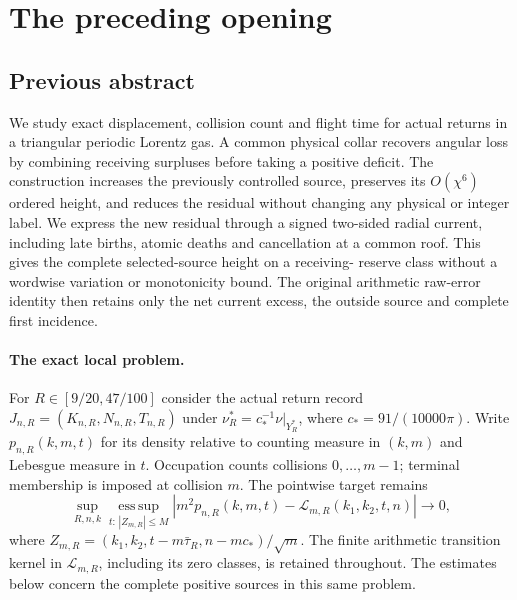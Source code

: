 \section{The preceding opening}
\label{app:v72-retained-front}
\subsection*{Previous abstract}

We study exact displacement, collision count and flight time for
actual returns in a triangular periodic Lorentz gas. A common physical
collar recovers angular loss by combining receiving surpluses before
taking a positive deficit. The construction increases the previously
controlled source, preserves its $O(\chi^6)$ ordered height, and
reduces the residual without changing any physical or integer label.
We express the new residual through a signed two-sided radial current,
including late births, atomic deaths and cancellation at a common
roof. This gives the complete selected-source height on a receiving-
reserve class without a wordwise variation or monotonicity bound.
The original arithmetic raw-error identity then retains only the net
current excess, the outside source and complete first incidence.



\paragraph{The exact local problem.}
For $R\in[9/20,47/100]$ consider the actual return record
$J_{n,R}=(K_{n,R},N_{n,R},T_{n,R})$ under
$\nu_R^*=c_*^{-1}\nu|_{Y_R^*}$, where $c_*=91/(10000\pi)$.
Write $p_{n,R}(k,m,t)$ for its density relative to counting measure
in $(k,m)$ and Lebesgue measure in $t$. Occupation counts collisions
$0,\ldots,m-1$; terminal membership is imposed at collision $m$.
The pointwise target remains
\begin{equation}\label{eq:intro-v71-target}
 \sup_{R,n,k}\operatorname*{ess\,sup}_{t:\,|Z_{m,R}|\le M}
 \left|m^2p_{n,R}(k,m,t)-\mathcal L_{m,R}(k_1,k_2,t,n)\right|
 \longrightarrow0,
\end{equation}
where $Z_{m,R}=(k_1,k_2,t-m\bar\tau_R,n-mc_*)/\sqrt m$.
The finite arithmetic transition kernel in $\mathcal L_{m,R}$,
including its zero classes, is retained throughout. The estimates
below concern the complete positive sources in this same problem.

